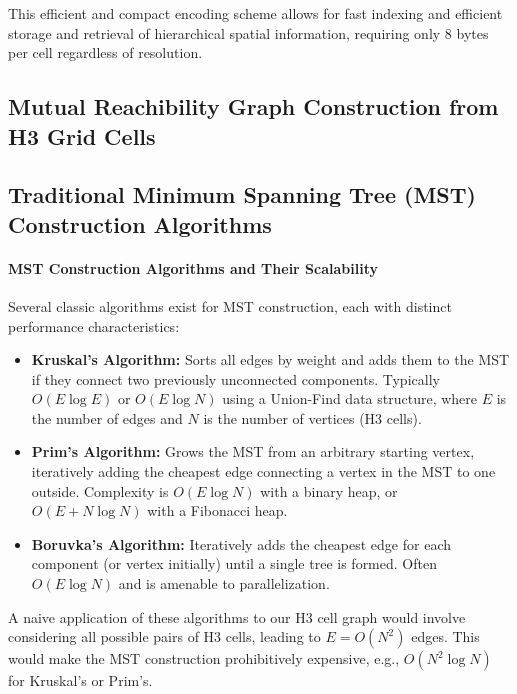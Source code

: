 This efficient and compact encoding scheme allows for fast indexing and efficient storage and retrieval of hierarchical spatial information, requiring only 8 bytes per cell regardless of resolution.

\subsection{Mutual Reachibility Graph Construction from H3 Grid Cells}

\subsection{Traditional Minimum Spanning Tree (MST) Construction Algorithms}

\paragraph{MST Construction Algorithms and Their Scalability}
Several classic algorithms exist for MST construction, each with distinct performance characteristics:
\begin{itemize}
    \item \textbf{Kruskal's Algorithm:} Sorts all edges by weight and adds them to the MST if they connect two previously unconnected components. Typically $O(E \log E)$ or $O(E \log N)$ using a Union-Find data structure, where $E$ is the number of edges and $N$ is the number of vertices (H3 cells).
    \item \textbf{Prim's Algorithm:} Grows the MST from an arbitrary starting vertex, iteratively adding the cheapest edge connecting a vertex in the MST to one outside. Complexity is $O(E \log N)$ with a binary heap, or $O(E + N \log N)$ with a Fibonacci heap.
    \item \textbf{Boruvka's Algorithm:} Iteratively adds the cheapest edge for each component (or vertex initially) until a single tree is formed. Often $O(E \log N)$ and is amenable to parallelization.
\end{itemize}
A naive application of these algorithms to our H3 cell graph would involve considering all possible pairs of H3 cells, leading to $E = O(N^2)$ edges. This would make the MST construction prohibitively expensive, e.g., $O(N^2 \log N)$ for Kruskal's or Prim's.

